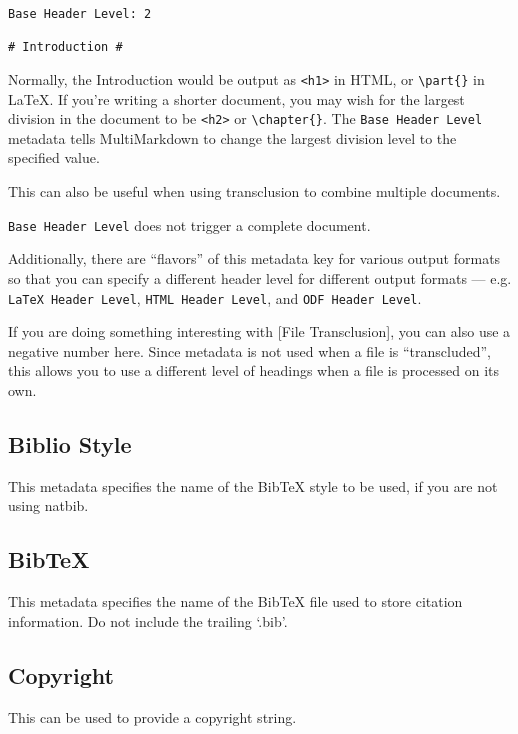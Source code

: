 \begin{verbatim}
Base Header Level: 2

# Introduction #
\end{verbatim}

Normally, the Introduction would be output as \texttt{<h1>} in HTML, or \texttt{\textbackslash{}part\{\}} in LaTeX. If you're writing a shorter document, you may wish for the largest division in the document to be \texttt{<h2>} or \texttt{\textbackslash{}chapter\{\}}. The \texttt{Base Header Level} metadata tells MultiMarkdown to change the largest division level to the specified value.

This can also be useful when using transclusion to combine multiple documents.

\texttt{Base Header Level} does not trigger a complete document.

Additionally, there are ``flavors'' of this metadata key for various output formats so that you can specify a different header level for different output formats --- e.g. \texttt{LaTeX Header Level}, \texttt{HTML Header Level}, and \texttt{ODF Header Level}.

If you are doing something interesting with {[File Transclusion]}, you can also use a negative number here. Since metadata is not used when a file is ``transcluded'', this allows you to use a different level of headings when a file is processed on its own.

\subsection{Biblio Style }
\label{bibliostyle}

This metadata specifies the name of the BibTeX style to be used, if you are
not using natbib.

\subsection{BibTeX }
\label{bibtex}

This metadata specifies the name of the BibTeX file used to store citation
information. Do not include the trailing `.bib'.

\subsection{Copyright }
\label{copyright}

This can be used to provide a copyright string.

